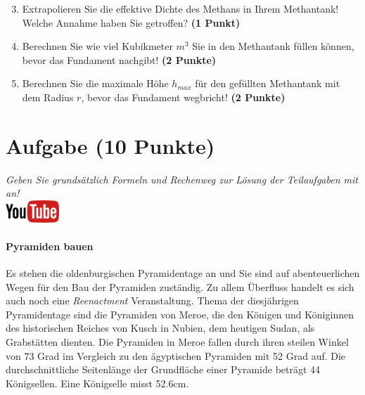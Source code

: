 \documentclass[a4paper, 10pt]{scrartcl}\usepackage[]{graphicx}\usepackage[]{xcolor}
\begin{document}
\begin{enumerate}
  \setcounter{enumi}{2}
\item Extrapolieren Sie die effektive Dichte des Methans in Ihrem
  Methantank! Welche Annahme haben Sie getroffen? \textbf{(1 Punkt)}
\item Berechnen Sie wie viel Kubikmeter $m^3$ Sie in den Methantank f{\"u}llen
  k{\"o}nnen, bevor das Fundament nachgibt! \textbf{(2 Punkte)}
\item Berechnen Sie die maximale H{\"o}he $h_{max}$ f{\"u}r den gef{\"u}llten
  Methantank mit dem Radius $r$, bevor das Fundament wegbricht! \textbf{(2
    Punkte)}
\end{enumerate}

 
\clearpage

\section{Aufgabe \hfill (10 Punkte)}

\textit{Geben Sie grunds{\"a}tzlich Formeln und Rechenweg zur L{\"o}sung der
  Teilaufgaben mit an!} \\[1Ex]

\hfill\href{https://youtu.be/tDgr6fpkkYA}{\includegraphics[width =
  2cm]{img/youtube}} %
\hspace{2Ex}

\paragraph{Pyramiden bauen}



Es stehen die oldenburgischen Pyramidentage an und Sie sind auf
abenteuerlichen Wegen f{\"u}r den Bau der Pyramiden zust{\"a}ndig. Zu allem
{\"U}berfluss handelt es sich auch noch eine \textit{Reenactment}
Veranstaltung. Thema der diesj{\"a}hrigen Pyramidentage sind die Pyramiden von
Meroe, die den K{\"o}nigen und K{\"o}niginnen des historischen Reiches von Kusch in
Nubien, dem heutigen Sudan, als Grabst{\"a}tten dienten. Die Pyramiden in Meroe
fallen durch ihren steilen Winkel von 73 Grad im Vergleich zu
den {\"a}gyptischen Pyramiden mit 52 Grad auf. Die durchschnittliche
Seitenl{\"a}nge der Grundfl{\"a}che einer Pyramide betr{\"a}gt 44 K{\"o}nigsellen. Eine K{\"o}nigselle
misst 52.6cm.\\
\end{document}
